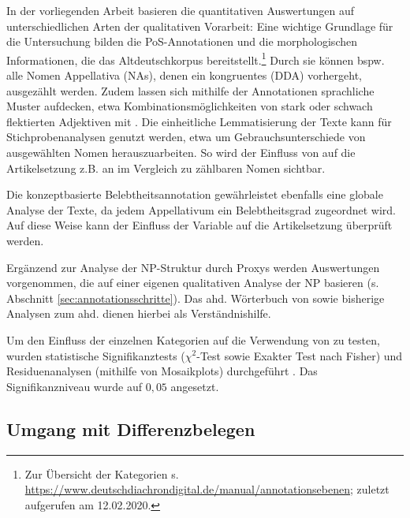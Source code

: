 In der vorliegenden Arbeit basieren die quantitativen Auswertungen auf unterschiedlichen Arten der qualitativen Vorarbeit:
Eine wichtige Grundlage für die Untersuchung bilden die PoS-Annotationen  und die morphologischen Informationen, die das Altdeutschkorpus  bereitstellt.\footnote{Zur Übersicht der Kategorien s. \url{https://www.deutschdiachrondigital.de/manual/annotationsebenen}; zuletzt aufgerufen am 12.02.2020.} Durch sie können bspw. alle Nomen Appellativa  (NAs), denen ein kongruentes   (DDA) vorhergeht, ausgezählt werden.
Zudem lassen sich mithilfe der Annotationen  sprachliche Muster aufdecken, etwa Kombinationsmöglichkeiten von stark oder schwach flektierten Adjektiven mit . Die einheitliche  Lemmatisierung der Texte kann für Stichprobenanalysen genutzt werden, etwa um Gebrauchsunterschiede von ausgewählten Nomen  herauszuarbeiten. So wird der Einfluss von  auf die Artikelsetzung z.B. an  im Vergleich zu zählbaren Nomen sichtbar.

Die konzeptbasierte Belebtheitsannotation gewährleistet ebenfalls eine globale Analyse der Texte, da jedem Appellativum  ein Belebtheitsgrad  zugeordnet wird. Auf diese Weise kann der Einfluss der Variable  auf die Artikelsetzung überprüft werden. 

Ergänzend zur Analyse der NP-Struktur durch Proxys  werden Auswertungen vorgenommen, die auf einer eigenen qualitativen Analyse der NP  basieren (s. Abschnitt \ref{sec:annotationsschritte}). Das ahd. Wörterbuch von \textcite{Schutzeichel2012} sowie bisherige Analysen zum ahd.  \parencite[v.a.][]{Oubouzar1989} dienen hierbei als Verständnishilfe.  

Um den Einfluss der einzelnen Kategorien auf die Verwendung von  zu testen, wurden statistische Signifikanztests ($\chi^2$-Test sowie Exakter Test nach Fisher) und Residuenanalysen (mithilfe von Mosaikplots) durchgeführt \parencite{Gries2012}. Das Signifikanzniveau wurde auf $0,05$ angesetzt.

\subsection{Umgang mit Differenzbelegen}\label{sec:differenz}

